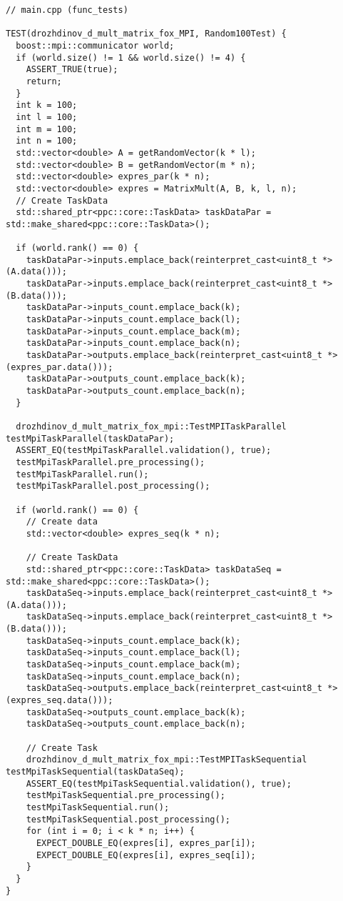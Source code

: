 \documentclass{report}
\begin{document}
\begin{lstlisting}
// main.cpp (func_tests)

TEST(drozhdinov_d_mult_matrix_fox_MPI, Random100Test) {
  boost::mpi::communicator world;
  if (world.size() != 1 && world.size() != 4) {
    ASSERT_TRUE(true);
    return;
  }
  int k = 100;
  int l = 100;
  int m = 100;
  int n = 100;
  std::vector<double> A = getRandomVector(k * l);
  std::vector<double> B = getRandomVector(m * n);
  std::vector<double> expres_par(k * n);
  std::vector<double> expres = MatrixMult(A, B, k, l, n);
  // Create TaskData
  std::shared_ptr<ppc::core::TaskData> taskDataPar = std::make_shared<ppc::core::TaskData>();

  if (world.rank() == 0) {
    taskDataPar->inputs.emplace_back(reinterpret_cast<uint8_t *>(A.data()));
    taskDataPar->inputs.emplace_back(reinterpret_cast<uint8_t *>(B.data()));
    taskDataPar->inputs_count.emplace_back(k);
    taskDataPar->inputs_count.emplace_back(l);
    taskDataPar->inputs_count.emplace_back(m);
    taskDataPar->inputs_count.emplace_back(n);
    taskDataPar->outputs.emplace_back(reinterpret_cast<uint8_t *>(expres_par.data()));
    taskDataPar->outputs_count.emplace_back(k);
    taskDataPar->outputs_count.emplace_back(n);
  }

  drozhdinov_d_mult_matrix_fox_mpi::TestMPITaskParallel testMpiTaskParallel(taskDataPar);
  ASSERT_EQ(testMpiTaskParallel.validation(), true);
  testMpiTaskParallel.pre_processing();
  testMpiTaskParallel.run();
  testMpiTaskParallel.post_processing();

  if (world.rank() == 0) {
    // Create data
    std::vector<double> expres_seq(k * n);

    // Create TaskData
    std::shared_ptr<ppc::core::TaskData> taskDataSeq = std::make_shared<ppc::core::TaskData>();
    taskDataSeq->inputs.emplace_back(reinterpret_cast<uint8_t *>(A.data()));
    taskDataSeq->inputs.emplace_back(reinterpret_cast<uint8_t *>(B.data()));
    taskDataSeq->inputs_count.emplace_back(k);
    taskDataSeq->inputs_count.emplace_back(l);
    taskDataSeq->inputs_count.emplace_back(m);
    taskDataSeq->inputs_count.emplace_back(n);
    taskDataSeq->outputs.emplace_back(reinterpret_cast<uint8_t *>(expres_seq.data()));
    taskDataSeq->outputs_count.emplace_back(k);
    taskDataSeq->outputs_count.emplace_back(n);

    // Create Task
    drozhdinov_d_mult_matrix_fox_mpi::TestMPITaskSequential testMpiTaskSequential(taskDataSeq);
    ASSERT_EQ(testMpiTaskSequential.validation(), true);
    testMpiTaskSequential.pre_processing();
    testMpiTaskSequential.run();
    testMpiTaskSequential.post_processing();
    for (int i = 0; i < k * n; i++) {
      EXPECT_DOUBLE_EQ(expres[i], expres_par[i]);
      EXPECT_DOUBLE_EQ(expres[i], expres_seq[i]);
    }
  }
}


\end{lstlisting}
\end{document}
